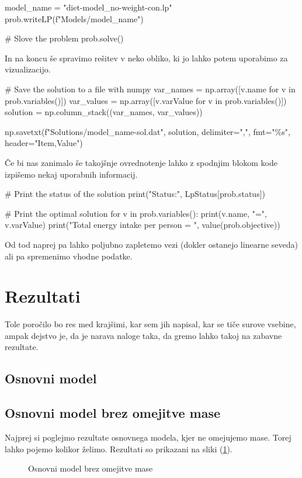 \documentclass[a4paper]{article}
\begin{document}
\begin{pythonlst}
    model_name = "diet-model_no-weight-con.lp"
    prob.writeLP(f"Models/{model_name}")

    # Slove the problem
    prob.solve()
\end{pythonlst}

In na koncu še spravimo rešitev v neko obliko, ki jo lahko potem uporabimo za vizualizacijo.

\begin{pythonlst}
    # Save the solution to a file with numpy
    var_names = np.array([v.name for v in prob.variables()])
    var_values = np.array([v.varValue for v in prob.variables()])
    solution = np.column_stack((var_names, var_values))

    np.savetxt(f"Solutions/{model_name}-sol.dat", solution, delimiter=",", fmt="\%s", header="Item,Value")
\end{pythonlst}

Če bi nas zanimalo še takojšnje ovrednotenje lahko z spodnjim blokom kode izpišemo nekaj uporabnih
informacij.

\begin{pythonlst}
    # Print the status of the solution
    print("Status:", LpStatus[prob.status])

    # Print the optimal solution
    for v in prob.variables():
        print(v.name, "=", v.varValue)
    print("Total energy intake per person = ", value(prob.objective))
\end{pythonlst}

Od tod naprej pa lahko poljubno zapletemo vezi (dokler ostanejo linearne seveda) ali pa spremenimo
vhodne podatke. \\

\section{Rezultati}
Tole poročilo bo res med krajšimi, kar sem jih napisal, kar se tiče surove vsebine, ampak 
dejstvo je, da je narava naloge taka, da gremo lahko takoj na zabavne rezultate. \\

\subsection{Osnovni model}
\subsection{Osnovni model brez omejitve mase}
Najprej si poglejmo rezultate osnovnega modela, kjer ne omejujemo mase. Torej lahko pojemo kolikor
želimo. Rezultati so prikazani na sliki (\ref{fig:basic-no-mass}). \\
\begin{figure}[H]
    \centering
    \caption{Osnovni model brez omejitve mase}
    \label{fig:basic-no-mass}
\end{figure}
\end{document}
